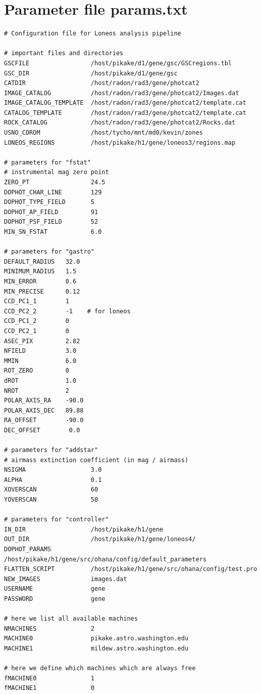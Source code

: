 \documentclass{article}
\begin{document}
\section{Parameter file params.txt}
\begin{verbatim}
# Configuration file for Loneos analysis pipeline

# important files and directories
GSCFILE                 /host/pikake/d1/gene/gsc/GSCregions.tbl
GSC_DIR                 /host/pikake/d1/gene/gsc
CATDIR                  /host/radon/rad3/gene/photcat2
IMAGE_CATALOG           /host/radon/rad3/gene/photcat2/Images.dat
IMAGE_CATALOG_TEMPLATE  /host/radon/rad3/gene/photcat2/template.cat
CATALOG_TEMPLATE        /host/radon/rad3/gene/photcat2/template.cat
ROCK_CATALOG            /host/radon/rad3/gene/photcat2/Rocks.dat
USNO_CDROM              /host/tycho/mnt/md0/kevin/zones
LONEOS_REGIONS          /host/pikake/h1/gene/loneos3/regions.map

# parameters for "fstat"
# instrumental mag zero point
ZERO_PT                 24.5
DOPHOT_CHAR_LINE        129
DOPHOT_TYPE_FIELD       5
DOPHOT_AP_FIELD         91
DOPHOT_PSF_FIELD        52
MIN_SN_FSTAT            6.0

# parameters for "gastro"
DEFAULT_RADIUS   32.0
MINIMUM_RADIUS   1.5
MIN_ERROR        0.6
MIN_PRECISE      0.12
CCD_PC1_1        1
CCD_PC2_2        -1    # for loneos
CCD_PC1_2        0
CCD_PC2_1        0
ASEC_PIX         2.82
NFIELD           3.0
MMIN             6.0
ROT_ZERO         0
dROT             1.0
NROT             2
POLAR_AXIS_RA    -90.0
POLAR_AXIS_DEC   89.88
RA_OFFSET        -90.0
DEC_OFFSET        0.0

# parameters for "addstar"
# airmass extinction coefficient (in mag / airmass)
NSIGMA                  3.0
ALPHA                   0.1
XOVERSCAN               60
YOVERSCAN               50

# parameters for "controller"
IN_DIR                  /host/pikake/h1/gene
OUT_DIR                 /host/pikake/h1/gene/loneos4/
DOPHOT_PARAMS           /host/pikake/h1/gene/src/ohana/config/default_parameters
FLATTEN_SCRIPT          /host/pikake/h1/gene/src/ohana/config/test.pro
NEW_IMAGES              images.dat
USERNAME                gene
PASSWORD                gene

# here we list all available machines
NMACHINES               2
MACHINE0                pikake.astro.washington.edu
MACHINE1                mildew.astro.washington.edu

# here we define which machines which are always free
fMACHINE0               1
fMACHINE1               0


\end{verbatim}
\end{document}
